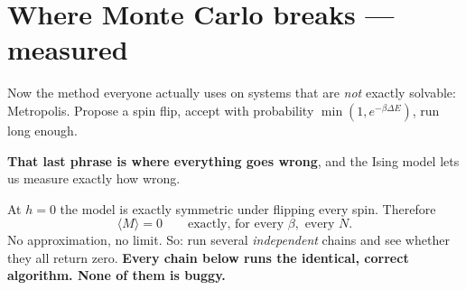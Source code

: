 \clearpage
\renewcommand{\sectioncolor}{alert}
\section{Where Monte Carlo breaks --- measured}

Now the method everyone actually uses on systems that are \emph{not} exactly solvable: Metropolis.
Propose a spin flip, accept with probability $\min(1,e^{-\beta\Delta E})$, run long enough.

\textbf{That last phrase is where everything goes wrong}, and the Ising model lets us measure exactly
how wrong.

\begin{keyidea}[title={A perfect test, because we know the answer exactly}]
At $h=0$ the model is exactly symmetric under flipping every spin. Therefore
\[
\langle M\rangle = 0 \qquad\text{exactly, for every }\beta,\text{ every }N.
\]
No approximation, no limit. So: run several \emph{independent} chains and see whether they all return
zero. \textbf{Every chain below runs the identical, correct algorithm. None of them is buggy.}
\end{keyidea}

